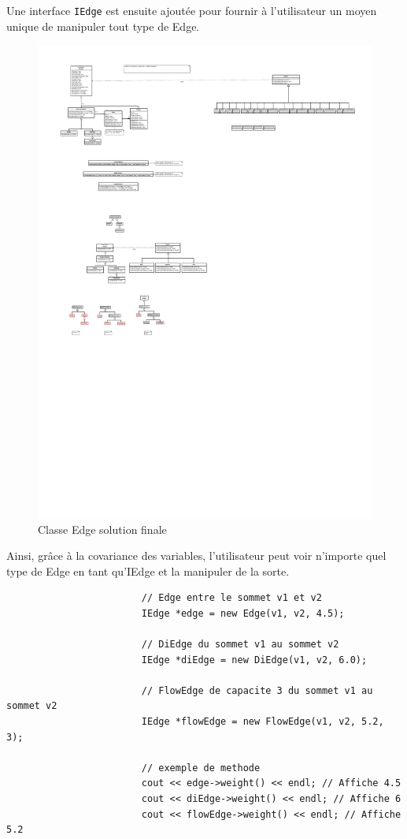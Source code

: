 \documentclass[french]{article}
\begin{document}
			Une interface \lstinline[basicstyle=\ttfamily\color{blue}]|IEdge| est ensuite ajoutée pour fournir à l'utilisateur un moyen unique de manipuler tout type de Edge.
			\begin{figure}[H]
				\centering
				\includegraphics[scale=4.0]{Conception/graph/classedgesol3.pdf}
				\caption{Classe Edge solution finale}
			\end{figure}
			
			Ainsi, grâce à la covariance des variables, l'utilisateur peut voir n'importe quel type de Edge en tant qu'IEdge et la manipuler de la sorte.
			\begin{lstlisting}
						// Edge entre le sommet v1 et v2
						IEdge *edge = new Edge(v1, v2, 4.5);
						
						// DiEdge du sommet v1 au sommet v2
						IEdge *diEdge = new DiEdge(v1, v2, 6.0);
						
						// FlowEdge de capacite 3 du sommet v1 au sommet v2
						IEdge *flowEdge = new FlowEdge(v1, v2, 5.2, 3);
						
						// exemple de methode
						cout << edge->weight() << endl; // Affiche 4.5
						cout << diEdge->weight() << endl; // Affiche 6
						cout << flowEdge->weight() << endl; // Affiche 5.2
			\end{lstlisting}
						
\end{document}
